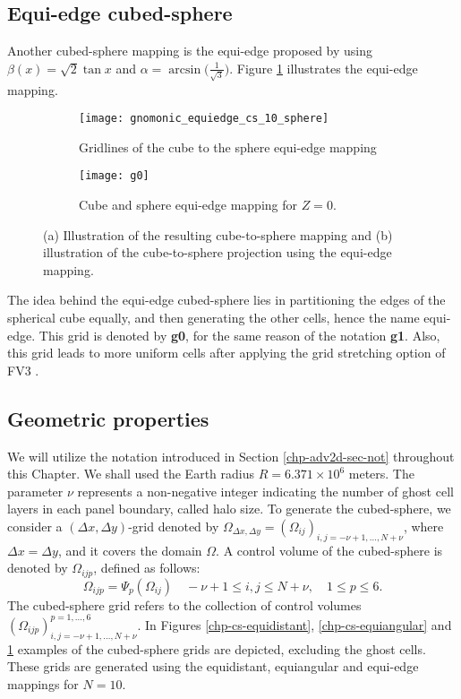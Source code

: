 \subsection{Equi-edge cubed-sphere}
\label{cs-equiedge}
Another cubed-sphere mapping is the equi-edge proposed by
\citet{chen:2021} using $\beta(x) = \sqrt{2}\tan{x}$ and
$\alpha=\arcsin{\big(\frac{1}{\sqrt{3}}\big)}$.
Figure \ref{chp-cs-equiedge} illustrates the equi-edge mapping.
\begin{figure}[!htb]
	\centering
	\begin{subfigure}{0.42\textwidth}
		\texttt{[image: gnomonic\_equiedge\_cs\_10\_sphere]}
		\caption{Gridlines of the cube to the sphere equi-edge mapping}
	\end{subfigure}
	\begin{subfigure}{0.42\textwidth}
		\centering
		\texttt{[image: g0]}
		\caption{Cube and sphere equi-edge mapping for $Z=0$.}
	\end{subfigure}
	\caption{(a) Illustration of the resulting cube-to-sphere mapping and (b) illustration of the cube-to-sphere projection using the equi-edge mapping.\label{chp-cs-equiedge}}
\end{figure}

The idea behind the equi-edge cubed-sphere lies in partitioning the edges of the spherical cube equally,
and then generating the other cells, hence the name equi-edge.
This grid is denoted by \textbf{g0}, for the same reason of the notation \textbf{g1}.
Also, this grid leads to more uniform cells after applying the grid stretching option of FV3 \citep{harris:2016, chen:2021}.

\subsection{Geometric properties}
\label{cs-geo}
We will utilize the notation introduced in Section \ref{chp-adv2d-sec-not} throughout this Chapter.
We shall used the Earth radius $R = 6.371 \times 10^6$ meters.
The parameter $\nu$ represents a non-negative integer indicating the number of ghost cell layers in each panel boundary, called halo size.
To generate the cubed-sphere, we consider a $(\Delta x, \Delta y)$-grid denoted by 
$\Omega_{\Delta x, \Delta y} = (\Omega_{ij})_{i,j=-\nu+1,\ldots,N+\nu}$, 
where $\Delta x = \Delta y$, and it covers the domain $\Omega$. 
A control volume of the cubed-sphere is denoted by $\Omega_{ijp}$, defined as follows:
\begin{equation*}
	\Omega_{ijp} = \Psi_p(\Omega_{ij})
	\quad -\nu+1 \leq i, j \leq N+\nu, \quad 1 \leq p \leq 6.
\end{equation*}
The cubed-sphere grid refers to the collection of control volumes 
$(\Omega_{ijp})_{i,j=-\nu+1,\ldots,N+\nu}^{p=1,\ldots,6}$. 
In Figures \ref{chp-cs-equidistant}, \ref{chp-cs-equiangular} and \ref{chp-cs-equiedge} examples of the cubed-sphere grids are depicted,
excluding the ghost cells.
These grids are generated using the equidistant, equiangular and equi-edge mappings for $N=10$.


